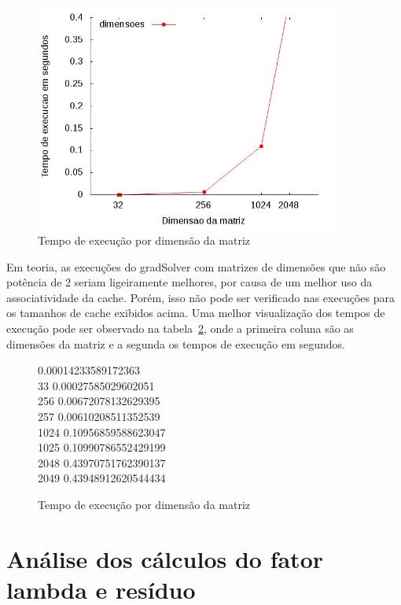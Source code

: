 \documentclass[12pt]{article}
\begin{document}
\begin{figure}[htb] \begin{center}
\includegraphics[width=100mm]{img/execucoes.jpg} \end{center}
\caption{Tempo de execução por dimensão da matriz}\label{fig:execucao}
\end{figure}

Em teoria, as execuções do gradSolver com matrizes de dimensões que não são
potência de 2 seriam ligeiramente melhores, por causa de um melhor uso da
associatividade da cache. Porém, isso não pode ser verificado nas execuções para
os tamanhos de cache exibidos acima. Uma melhor visualização dos tempos de
execução pode ser observado na tabela~\ref{fig:tabelaExecucoes}, onde a primeira
coluna são as dimensões da matriz e a segunda os tempos de execução em segundos.

\begin{figure}[htb]
\begin{tt}      0.00014233589172363\\
    33      0.00027585029602051\\
    256     0.00672078132629395\\
    257     0.00610208511352539\\
    1024    0.10956859588623047\\
    1025    0.10990786552429199\\
    2048    0.43970751762390137\\
    2049    0.43948912620544434\\
\end{tt}\caption{Tempo de execução por dimensão da matriz}\label{fig:tabelaExecucoes}
\end{figure}

\section{Análise dos cálculos do fator lambda e resíduo}\label{sec:lambdaResiduo}
\end{document}
